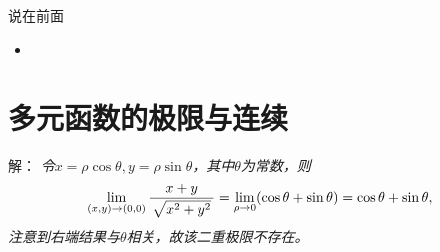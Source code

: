 
\titlepage

\begin{frame}{说在前面}
	\linespread{1.5}
	  \begin{itemize}[<+-|alert@+>]
	    \item {}
	  \end{itemize}
\end{frame}


\section{多元函数的极限与连续}

\begin{frame}
	\linespread{1.5}
	
	\bigskip
	
	\small 解：\it
	令$x=\rho\cos\theta,y=\rho\sin\theta$，其中$\theta$为常数，则
	$$\lim\limits_{(x,y)\to(0,0)}\displaystyle\frac{\,{x+y}\,}{\,{\sqrt{x^2+y^2}}\,}
	=\lim\limits_{\rho\to 0}(\cos\theta+\sin\theta)=\cos\theta+\sin\theta,$$
	注意到右端结果与$\theta$相关，故该二重极限不存在。
	
\end{frame}

